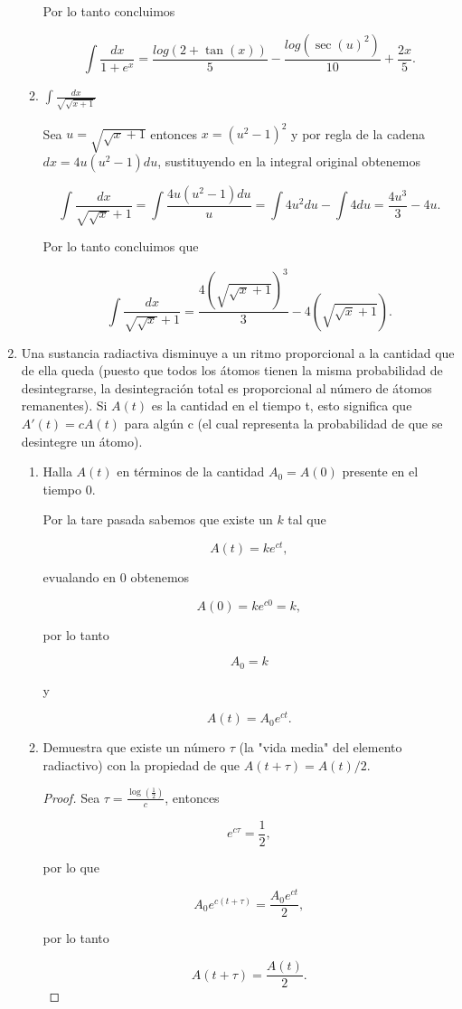 \documentclass[letterpaper]{article}
\theoremstyle{definition}
\theoremstyle{lemathm}
\theoremstyle{lemademthm}
\begin{document}
\begin{enumerate}
\begin{enumerate}
			Por lo tanto concluimos

			\[\int \frac{dx}{1+e^x} = \frac{log(2+\tan(x))}{5} - \frac{log(\sec(u)^2)}{10} + \frac{2x}{5}.\]

            \item $\int \frac{dx}{\sqrt{\sqrt{x+1}}}$

			Sea $u = \sqrt{\sqrt{x}+1}$ entonces $x = (u^2 - 1)^2$ y por regla de la cadena $dx = 4u(u^2-1)du$, sustituyendo en la integral original obtenemos

			\[\int \frac{dx}{\sqrt{\sqrt{x}}+1} = \int \frac{4u(u^2-1)du}{u} = \int 4u^2du - \int 4du = \frac{4u^3}{3} - 4u.\]

			Por lo tanto concluimos que

			\[\int \frac{dx}{\sqrt{\sqrt{x}}+1} = \frac{4\left(\sqrt{\sqrt{x}+1}\right)^3}{3} - 4\left(\sqrt{\sqrt{x}+1}\right).\]

        \end{enumerate}
		
		\item Una sustancia radiactiva disminuye a un ritmo proporcional a la cantidad que de ella queda (puesto que todos los átomos tienen la misma probabilidad de desintegrarse, la desintegración total es proporcional al número de átomos remanentes). Si $A(t)$ es la cantidad en el tiempo t, esto significa que $A'(t) = cA(t)$ para algún c (el cual representa la probabilidad de que se desintegre	un átomo).
		
		\begin{enumerate}
			\item Halla $A(t)$ en términos de la cantidad $A_0 = A(0)$ presente
			en el tiempo 0.

			Por la tare pasada sabemos que existe un $k$ tal que

			\[A(t) = ke^{ct},\]

			evualando en $0$ obtenemos

			\[A(0) = ke^{c0} = k,\]

			por lo tanto

			\[A_0 = k\]

			y

			\[A(t) = A_0e^{ct}.\]

			\item  Demuestra que existe un número $\tau$ (la "vida media" del
			elemento radiactivo) con la propiedad de que $A(t + \tau) = A(t)/2$.

			\begin{proof}

				Sea $\tau = \frac{\log(\frac{1}{2})}{c}$, entonces

				\[e^{c\tau} = \frac{1}{2},\]

				por lo que

				\[A_0e^{c(t + \tau)} = \frac{A_0e^{ct}}{2},\]

				por lo tanto

				\[A(t + \tau) = \frac{A(t)}{2}.\]

			\end{proof}

		\end{enumerate}

	\end{enumerate}
	
\end{document}
